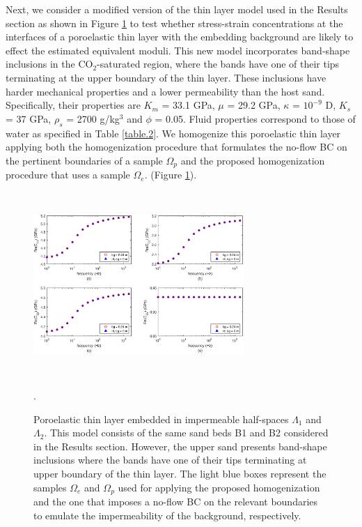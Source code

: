 \documentclass[draft]{agujournal2019}
\begin{document}
Next, we consider a modified version of the thin layer model used in the Results section as shown in Figure \ref{fig.6} to test whether stress-strain concentrations at the interfaces of a poroelastic thin layer with the embedding background are likely to effect the estimated equivalent moduli. This new model incorporates band-shape inclusions in the CO$_2$-saturated region, where the bands have one of their tips terminating at the upper boundary of the thin layer. These inclusions have harder mechanical properties and a lower permeability than the host sand. Specifically, their properties are $K_m$ = 33.1 GPa,  $\mu$ = 29.2 GPa, $\kappa$ = $10^{-9}$ D, $K_s$ = 37 GPa, $\rho_s$ = 2700 g/kg$^3$ and $\phi$ = 0.05. Fluid properties correspond to those of water as specified in Table \ref{table.2}. We homogenize this poroelastic thin layer applying both the homogenization procedure that formulates the no-flow BC on the pertinent boundaries of a sample $\Omega_p$  and the proposed homogenization procedure that uses a sample $\Omega_e$. (Figure \ref{fig.6}).

\begin{figure}[!ht]
\centering
        \includegraphics[width= 80mm, height=70mm]{Figure6.eps}
\caption{Poroelastic thin layer embedded in impermeable half-spaces $\Lambda_1$ and $\Lambda_2$. This model consists of the same sand beds B1 and B2 considered in the Results section. However, the upper sand presents band-shape inclusions where the bands have one of their tips terminating at upper boundary of the thin layer. The light blue boxes represent the samples $\Omega_e$ and $\Omega_p$ used for applying the proposed homogenization and the one that imposes a no-flow BC on the relevant boundaries to emulate the impermeability of the background, respectively.}. 
\label{fig.6}
\end{figure}
\end{document}
